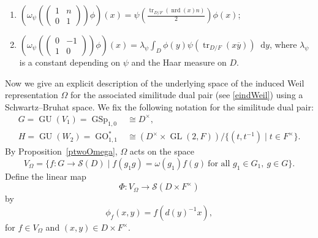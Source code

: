 \documentclass[11pt]{article}
\theoremstyle{plain}
\theoremstyle{remark}
\theoremstyle{definition}
\newcommand*\dd{\mathop{}\!\mathrm{d}}
\DeclareMathOperator{\tr}{tr}
\DeclareMathOperator{\GL}{GL}
\DeclareMathOperator{\GU}{GU}
\DeclareMathOperator{\nrd}{nrd}
\DeclareMathOperator{\GO}{GO}
\DeclareMathOperator{\GSp}{GSp}
\begin{document}
\begin{enumerate}
\begin{enumerate}
\item $(\omega_{\psi}(\begin{pmatrix}
1 & n \\
0 & 1
\end{pmatrix})\phi)(x)=\psi(\frac{\tr_{D/F}(\nrd(x)n)}{2})\phi(x)$;
\item $(\omega_{\psi}(\begin{pmatrix}
0 & -1 \\
1 & 0
\end{pmatrix})\phi)(x)=\lambda_{\psi}\int_{D}\phi(y)\psi(\tr_{D/F}(x\overline{y}))\dd y$,
where $\lambda_{\psi}$ is a constant depending on $\psi$ and the Haar measure on $D$.
\end{enumerate}
\end{enumerate}

Now we give an explicit description of the underlying space of the induced Weil representation $\Omega$ for the associated similitude dual pair (see \eqref{eindWeil}) using a Schwartz--Bruhat space.
We fix the following notation for the similitude dual pair:
\begin{equation*}
\begin{aligned}
G=\GU(V_1)=\GSp_{1,0}&\cong D^{\times},\\
H=\GU(W_2)=\GO_{1,1}^{*}&\cong (D^{\times}\times \GL(2,F))/\{(t,t^{-1})\mid t\in F^{\times}\}.
\end{aligned}
\end{equation*}
By Proposition~\ref{ptwoOmega}, $\Omega$ acts on the space
\[
    V_{\Omega}=\{f\colon G\to \mathcal{S}(D)\mid f(g_1 g)=\omega(g_1)f(g)\ \text{for all } g_1\in G_1,\ g\in G\}.
\]
Define the linear map
\[
    \Phi\colon V_{\Omega}\to \mathcal{S}(D\times F^{\times})
\]
by
\[
    \phi_{f}(x,y)=f(d(y)^{-1}x),
\]
for $f\in V_{\Omega}$ and $(x,y)\in D\times F^{\times}$.
\end{document}
